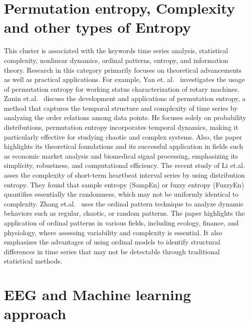 \section{Permutation entropy, Complexity and other types of Entropy}\label{Sec:ReviewTopicPE}
This cluster is associated with the keywords time series analysis, statistical complexity, nonlinear dynamics, ordinal patterns, entropy, and information theory. Research in this category primarily focuses on theoretical advancements as well as practical applications. For example, Yan et. al.~\cite{Yan2012} investigates the usage of permutation entropy for working status characterization of rotary machines. 
Zanin et.al.~\cite{Zanin2012}  discuss the development and applications of permutation entropy, a method that captures the temporal structure and complexity of time series by analyzing the order relations among data points. 
He focuses solely on probability distributions, permutation entropy incorporates temporal dynamics, making it particularly effective for studying chaotic and complex systems. 
Also, the paper highlights its theoretical foundations and its successful application in fields such as economic market analysis and biomedical signal processing, emphasizing its simplicity, robustness, and computational efficiency. The recent study of Li et.al.~\cite{Li2015e} asses the complexity of short-term heartbeat interval series by using distribution entropy. They found that sample entropy (SampEn) or fuzzy entropy (FuzzyEn) quantifies essentially the randomness, which may not be uniformly identical to complexity. Zhang et.al.~\cite{Zhang2018d} uses the ordinal pattern technique to analyze dynamic behaviors such as regular, chaotic, or random patterns. The paper highlights the application of ordinal patterns in various fields, including ecology, finance, and physiology, where assessing variability and complexity is essential. It also emphasizes the advantages of using ordinal models to identify structural differences in time series that may not be detectable through traditional statistical methods.

\section{EEG and Machine learning approach}\label{Sec:ReviewTopicEEG}


